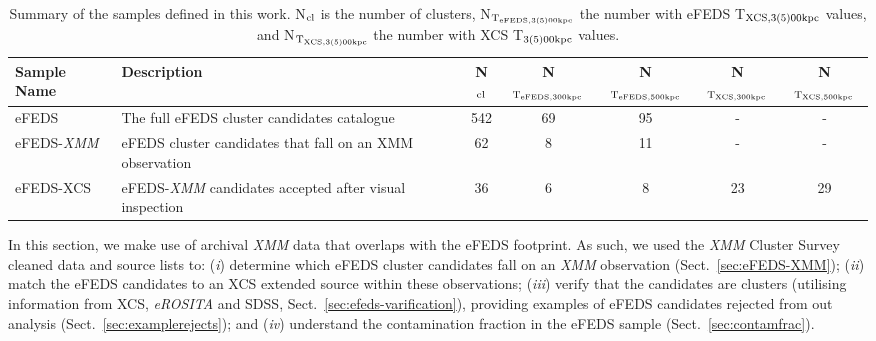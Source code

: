 \documentclass[fleqn,usenatbib]{mnras}
\begin{document}
\begin{table}
\begin{center}
\caption[]{{Summary of the samples defined in this work. N$_{\rm{cl}}$ is the number of clusters, N$_{\rm{T}_{\rm{eFEDS, 3(5)00kpc}}}$ the number with eFEDS T$_{\rm{XCS, 3(5)00kpc}}$ values, and N$_{\rm{T}_{\rm{XCS, 3(5)00kpc}}}$ the number with XCS T$_{\rm{3(5)00kpc}}$ values.}\label{tab:samples}}
\vspace{1mm}
\begin{tabular}{l|lccccc}
\hline
\hline
Sample Name & Description & N$_{\rm{cl}}$ & N$_{\rm{T}_{\rm{eFEDS, 300kpc}}}$ & N$_{\rm{T}_{\rm{eFEDS, 500kpc}}}$ & N$_{\rm{T}_{\rm{XCS, 300kpc}}}$ & N$_{\rm{T}_{\rm{XCS, 500kpc}}}$\\
\hline
\hline
eFEDS & The full eFEDS cluster candidates catalogue & 542 & 69 & 95 & - & - \\
\hline
eFEDS-{\em XMM} & eFEDS cluster candidates that fall on an XMM observation & 62 & 8 & 11 & - & - \\
\hline
eFEDS-XCS & eFEDS-{\em XMM} candidates accepted after visual inspection & 36 & 6 & 8 & 23 & 29 \\
\hline
\end{tabular}
\end{center}
\end{table}

In this section, we make use of archival {\em XMM} data that overlaps with the eFEDS footprint.  As such, we used the {\em XMM} Cluster Survey \citep[XCS,][]{xcsfoundation} cleaned data and source lists to: ({\em i}) determine which eFEDS cluster candidates fall on an {\em XMM} observation (Sect.~\ref{sec:eFEDS-XMM}); ({\em ii}) match the eFEDS candidates to an XCS extended source within these observations; ({\em iii}) verify that the candidates are clusters (utilising information from XCS, {\em eROSITA} and SDSS, Sect.~\ref{sec:efeds-varification}), providing examples of eFEDS candidates rejected from out analysis (Sect.~\ref{sec:examplerejects}); and ({\em iv}) understand the contamination fraction in the eFEDS sample (Sect.~\ref{sec:contamfrac}).
\end{document}
